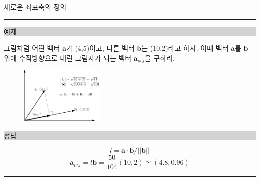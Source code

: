 \begin{frame}{새로운 좌표축의 정의}

\hrule
\noindent \colorbox{lightgray}{\begin{minipage}{6cm}예제\end{minipage}} 


\noindent 그림처럼 어떤 벡터 $\mathbf a$가 (4,5)이고, 다른 벡터 $\mathbf b$는 (10,2)라고 하자.
이때 벡터 $\mathbf a$를 $\mathbf b$ 위에 수직방향으로 내린 그림자가 되는 벡터 $\mathbf a_{prj}$을 구하라.

\begin{figure}
    \includegraphics[width=4cm]{Math_vector/vecProjection.eps}
\end{figure}

\noindent \colorbox{lightgray}{\begin{minipage}{6cm}정답\end{minipage}} 

$$l = \mathbf a \cdot \mathbf b / || \mathbf b||$$
$$\mathbf a_{prj} = l \tilde{\mathbf b} = \frac{50}{104} (10,2)  \simeq  (4.8, 0.96) $$

\hrule

\end{frame}

